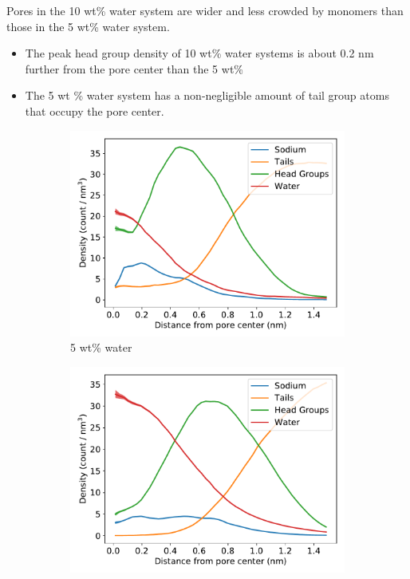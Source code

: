 \documentclass{article}
\begin{document}
  \noindent Pores in the 10 wt\% water system are wider and less crowded by monomers than
  those in the 5 wt\% water system.
  \begin{itemize}
    \item The peak head group density of 10 wt\% water systems is about 0.2 nm
    further from the pore center than the 5 wt\%
    \item The 5 wt \% water system has a non-negligible amount of tail group atoms
    that occupy the pore center.
  \end{itemize}
  
  \begin{figure}[!htb]
  \centering
  \begin{subfigure}{0.45\textwidth}
  \includegraphics[width=\textwidth]{component_density_5wt.pdf}
  \caption{5 wt\% water}\label{fig:component_density_5wt}
  \end{subfigure}
  \begin{subfigure}{0.45\textwidth}
  \includegraphics[width=\textwidth]{component_density_10wt.pdf}

\end{subfigure}
\end{figure}
\end{document}
